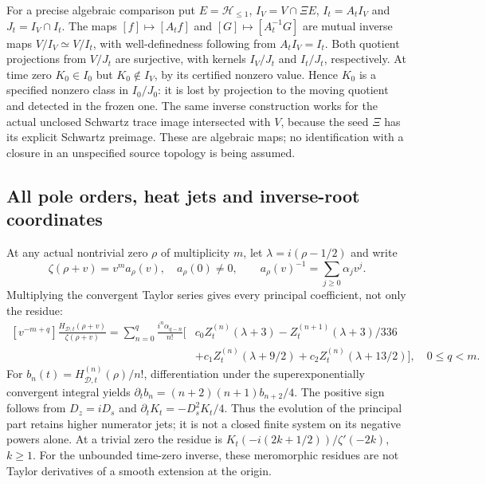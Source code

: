 For a precise algebraic comparison put $E=\mathcal H_{\le1}$,
$I_V=V\cap\Xi E$, $I_t=A_tI_V$ and $J_t=I_V\cap I_t$.
The maps $[f]\mapsto[A_tf]$ and $[G]\mapsto[A_t^{-1}G]$
are mutual inverse maps $V/I_V\simeq V/I_t$, with well-definedness
following from $A_tI_V=I_t$. Both quotient projections from $V/J_t$
are surjective, with kernels $I_V/J_t$ and $I_t/J_t$, respectively.
At time zero $K_0\in I_0$ but $K_0\notin I_V$, by its certified
nonzero value. Hence $K_0$ is a specified nonzero class in
$I_0/J_0$: it is lost by projection to the moving quotient and
detected in the frozen one. The same inverse construction works for
the actual unclosed Schwartz trace image intersected with $V$,
because the seed $\Xi$ has its explicit Schwartz preimage.
These are algebraic maps; no identification with a closure in an
unspecified source topology is being assumed.

\subsection{All pole orders, heat jets and inverse-root coordinates}

At any actual nontrivial zero $\rho$ of multiplicity $m$, let
$\lambda=i(\rho-1/2)$ and write
\[
 \zeta(\rho+v)=v^m a_\rho(v),\quad a_\rho(0)\ne0,
 \qquad a_\rho(v)^{-1}=\sum_{j\ge0}\alpha_jv^j.
\]
Multiplying the convergent Taylor series gives every principal
coefficient, not only the residue:
\begin{equation}\label{eq:xm-principal}
\begin{split}
 [v^{-m+q}]\frac{H_{\mathcal D,t}(\rho+v)}{\zeta(\rho+v)}
 =\sum_{n=0}^q\frac{i^n\alpha_{q-n}}{n!}
 \bigl[&c_0Z_t^{(n)}(\lambda+3)-Z_t^{(n+1)}(\lambda+3)/336\\
       &+c_1Z_t^{(n)}(\lambda+9/2)
        +c_2Z_t^{(n)}(\lambda+13/2)\bigr],\quad 0\le q<m.
\end{split}
\end{equation}
For $b_n(t)=H_{\mathcal D,t}^{(n)}(\rho)/n!$, differentiation
under the superexponentially convergent integral yields
$\partial_t b_n=(n+2)(n+1)b_{n+2}/4$.
The positive sign follows from $D_z=iD_s$ and
$\partial_tK_t=-D_s^2K_t/4$.
Thus the evolution of the principal part retains higher numerator
jets; it is not a closed finite system on its negative powers alone.
At a trivial zero the residue is
$K_t(-i(2k+1/2))/\zeta'(-2k)$, $k\ge1$.
For the unbounded time-zero inverse, these meromorphic residues
are not Taylor derivatives of a smooth extension at the origin.


